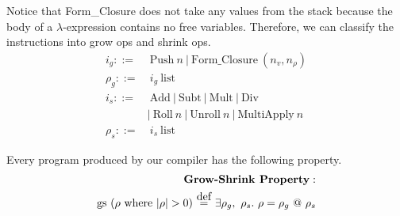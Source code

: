 \documentclass[11pt]{article}
\newcommand\myeq{\stackrel{\mathclap{\normalfont\mbox{def}}}{=}}
\begin{document}
Notice that Form\_Closure does not take any values from the stack because the body of a $\lambda$-expression contains no free variables. 
Therefore, we can classify the instructions into grow ops and shrink ops.
\begin{align*}
    i_g ::=&\ \text{Push}\ n\ |\ \text{Form\_Closure}\ (n_v, n_{\rho})\\
    \rho_g ::=&\ i_g\ \text{list}\\
    i_s ::=&\ \text {Add}\ |\ \text {Subt}\ |\ \text {Mult}\ |\ \text {Div}\\
    & |\ \text{Roll}\ n\ |\ \text {Unroll}\ n\ |\ \text{MultiApply}\ n\\
    \rho_s ::=&\ i_s\ \text{list}
\end{align*}

Every program produced by our compiler has the following property.
\begin{align*}
    \textbf{Grow-Shrink Property}:\\
    \text{gs}\ (\rho\ \text{where}\ |\rho| > 0)\ \myeq\ \exists \rho_g,\ \rho_s.\ \rho = \rho_g\ @\ \rho_s
\end{align*}
\end{document}
